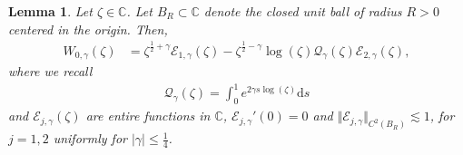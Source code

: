 \documentclass[11pt,reqno]{amsproc}
\newtheorem{lemma}[proposition]{Lemma}
\theoremstyle{definition}
\numberwithin{equation}{section}
\newcommand{\C}{{\mathbb C}}
\newcommand{\E}{{\mathcal E}}
\renewcommand{\d}{\mathrm{d}}
\begin{document}
\begin{lemma}\label{lemma:asymptoticexpansionW}
Let $\zeta\in\C$. Let $B_R\subset\C$ denote the closed unit ball of radius $R>0$ centered in the origin. Then,
\begin{align*}
W_{0,\gamma}(\zeta) &= \zeta^{\frac12+\gamma} \E_{1,\gamma}(\zeta) - \zeta^{\frac12-\gamma}\log (\zeta)\mathcal{Q}_\gamma(\zeta) \E_{2,\gamma}(\zeta),
\end{align*}
where we recall
\begin{align*}
\mathcal{Q}_\gamma(\zeta) = \int_0^1 e^{2\gamma s \log(\zeta)} \d s
\end{align*}
and $\E_{j,\gamma}(\zeta)$ are entire functions in $\C$, $\E_{j,\gamma}'(0)=0$ and $\Vert \E_{j,\gamma}\Vert_{C^2(B_R)}\lesssim 1$, for $j=1,2$ uniformly for $|\gamma|\leq\tfrac14$. 
\end{lemma}
\end{document}
